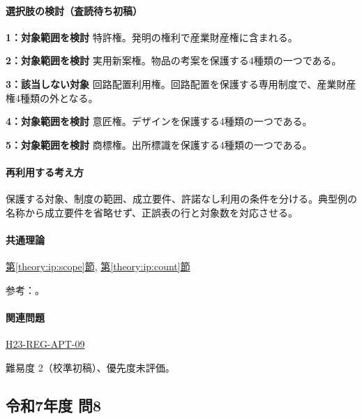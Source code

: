\paragraph{選択肢の検討（査読待ち初稿）}\mbox{}\par

\noindent\textbf{1：対象範囲を検討} 特許権。発明の権利で産業財産権に含まれる。\par

\noindent\textbf{2：対象範囲を検討} 実用新案権。物品の考案を保護する4種類の一つである。\par

\noindent\textbf{3：該当しない対象} 回路配置利用権。回路配置を保護する専用制度で、産業財産権4種類の外となる。\par

\noindent\textbf{4：対象範囲を検討} 意匠権。デザインを保護する4種類の一つである。\par

\noindent\textbf{5：対象範囲を検討} 商標権。出所標識を保護する4種類の一つである。\par

\paragraph{再利用する考え方} 保護する対象、制度の範囲、成立要件、許諾なし利用の条件を分ける。典型例の名称から成立要件を省略せず、正誤表の行と対象数を対応させる。

\paragraph{共通理論} \hyperref[theory:ip:scope]{第\ref*{theory:ip:scope}節}, \hyperref[theory:ip:count]{第\ref*{theory:ip:count}節}

\par 参考：\cite{ip_industrial_four,ip_broad_scope}。

\paragraph{関連問題} \hyperref[q:h23-reg-apt-09]{H23-REG-APT-09}

\par 難易度 2（校準初稿）、優先度未評価。

\subsection{令和7年度 問8}
\label{q:r07-reg-apt-08}

